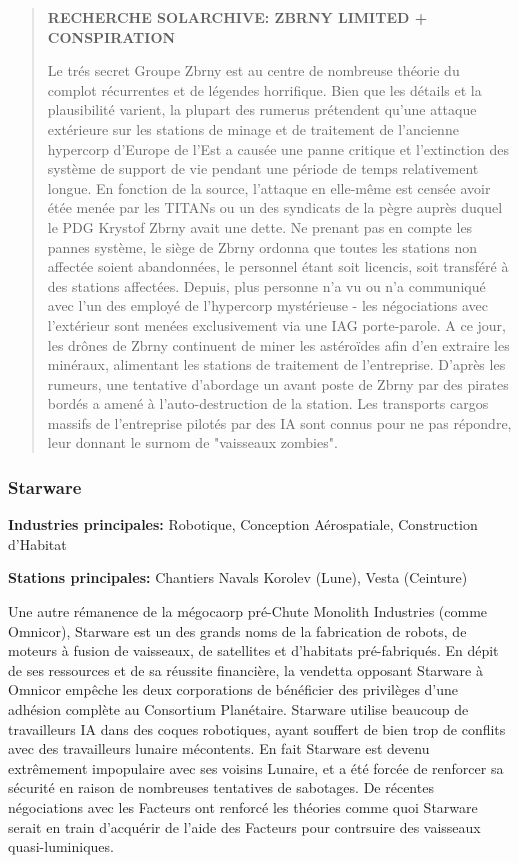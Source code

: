 \begin{quotation} \textbf{RECHERCHE SOLARCHIVE: ZBRNY LIMITED + CONSPIRATION} 

Le trés secret Groupe Zbrny est au centre de nombreuse théorie du complot récurrentes et de légendes horrifique. Bien que les détails et la plausibilité varient, la plupart des rumerus prétendent qu'une attaque extérieure sur les stations de minage et de traitement de l'ancienne hypercorp d'Europe de l'Est a causée une panne critique et l'extinction des système de support de vie pendant une période de temps relativement longue. En fonction de la source, l'attaque en elle-même est censée avoir étée menée par les TITANs ou un des syndicats de la pègre auprès duquel le PDG Krystof Zbrny avait une dette. Ne prenant pas en compte les pannes système, le siège de Zbrny ordonna que toutes les stations non affectée soient abandonnées, le personnel étant soit licencis, soit transféré à des stations affectées. Depuis, plus personne n'a vu ou n'a communiqué avec l'un des employé de l'hypercorp mystérieuse - les négociations avec l'extérieur sont menées exclusivement via une IAG porte-parole. A ce jour, les drônes de Zbrny continuent de miner les astéroïdes afin d'en extraire les minéraux, alimentant les stations de traitement de l'entreprise. D'après les rumeurs, une tentative d'abordage un avant poste de Zbrny par des pirates bordés a amené à l'auto-destruction de la station. Les transports cargos massifs de l'entreprise pilotés par des IA sont connus pour ne pas répondre, leur donnant le surnom de "vaisseaux zombies". \end{quotation} 

\subsubsection{Starware} \label{sec:starware} 

\textbf{Industries principales:} Robotique, Conception Aérospatiale, Construction d'Habitat 

\textbf{Stations principales:} Chantiers Navals Korolev (Lune), Vesta (Ceinture) 

Une autre rémanence de la mégocaorp pré-Chute Monolith Industries (comme Omnicor), Starware est un des grands noms de la fabrication de robots, de moteurs à fusion de vaisseaux, de satellites et d'habitats pré-fabriqués. En dépit de ses ressources et de sa réussite financière, la vendetta opposant Starware à Omnicor empêche les deux corporations de bénéficier des privilèges d'une adhésion complète au Consortium Planétaire. Starware utilise beaucoup de travailleurs IA dans des coques robotiques, ayant souffert de bien trop de conflits avec des travailleurs lunaire mécontents. En fait Starware est devenu extrêmement impopulaire avec ses voisins Lunaire, et a été forcée de renforcer sa sécurité en raison de nombreuses tentatives de sabotages. De récentes négociations avec les Facteurs ont renforcé les théories comme quoi Starware serait en train d'acquérir de l'aide des Facteurs pour contrsuire des vaisseaux quasi-luminiques. 

